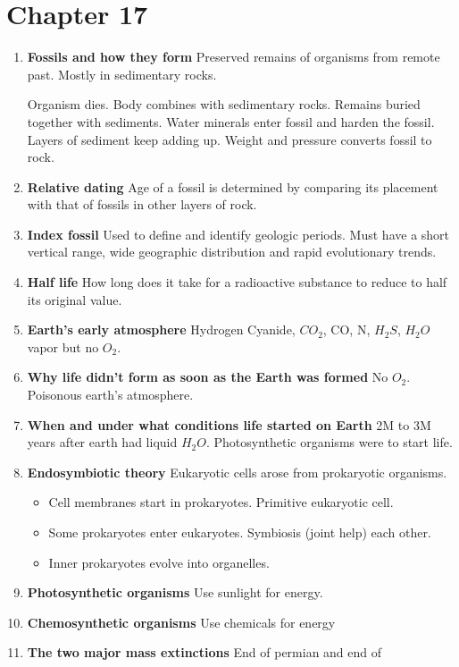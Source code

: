 \documentclass[9pt]{article}
\begin{document}
\section*{Chapter 17}
\begin{enumerate}
  \item {\bf Fossils and how they form} Preserved remains of organisms from remote past. Mostly in sedimentary rocks. 

  Organism dies. Body combines with sedimentary rocks. Remains buried together with sediments. 
  Water minerals enter fossil and harden the fossil. Layers of sediment keep adding up. Weight and pressure converts fossil to rock.

  \item {\bf Relative dating} Age of a fossil is determined by
    comparing its placement with that of fossils in other layers of
    rock.
  \item {\bf Index fossil} Used to define and identify geologic
    periods. Must have a short vertical range, wide geographic
    distribution and rapid evolutionary trends.
  \item  {\bf Half  life}  How long  does it  take  for a  radioactive
    substance to reduce to half its original value.
  \item {\bf Earth's early atmosphere} Hydrogen Cyanide, $CO_2$, CO, N,
    $H_2S$, $H_2O$ vapor but no $O_2$.
  \item {\bf Why life didn't form as soon as the Earth was formed} No $O_2$. Poisonous earth's atmosphere.
  \item {\bf When and under what conditions life started on Earth} 2M to 3M years after earth had liquid $H_2O$. Photosynthetic organisms were to start life.
  \item {\bf Endosymbiotic theory} Eukaryotic cells arose from
    prokaryotic organisms.
    \begin{itemize}
    \item Cell membranes start in prokaryotes. Primitive eukaryotic cell.
    \item Some prokaryotes enter eukaryotes. Symbiosis (joint help) each other.
    \item Inner prokaryotes evolve into organelles.
    \end{itemize}
  \item {\bf Photosynthetic organisms} Use sunlight for energy.
  \item {\bf Chemosynthetic organisms} Use chemicals for energy
  \item {\bf The two major mass extinctions} End of permian and end of

\end{enumerate}
\end{document}
